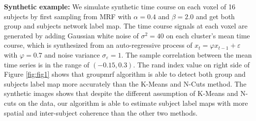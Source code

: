 \documentclass[runningheads,a4paper]{llncs}
\begin{document}
\noindent\textbf{Synthetic example:} We simulate synthetic time course on each
voxel of 16 subjects by first sampling from MRF with $\alpha = 0.4$ and $\beta =
2.0$ and get both group and subjects network label map. The time course signals
at each voxel are generated by adding Gaussian white noise of $\sigma^2 = 40$ on
each cluster's mean time course, which is synthesized from an auto-regressive
process of $x_t = \varphi x_{t-1} + \varepsilon$ with $\varphi = 0.7$ and noise
variance $\sigma_{\varepsilon} = 1$. The sample correlation between the mean
time series is in the range of $(-0.15, 0.3)$. The rand index value on right
side of Figure \ref{fig:fig1} shows that \textsf{groupmrf} algorithm is able to
detect both group and subjects label map more accurately than the
\textsf{K-Means} and \textsf{N-Cuts} method. The synthetic images shows that
despite the different assumption of \textsf{K-Means} and \textsf{N-cuts} on the
data, our algorithm is able to estimate subject label maps with more spatial and
inter-subject coherence than the other two methods.
\end{document}
